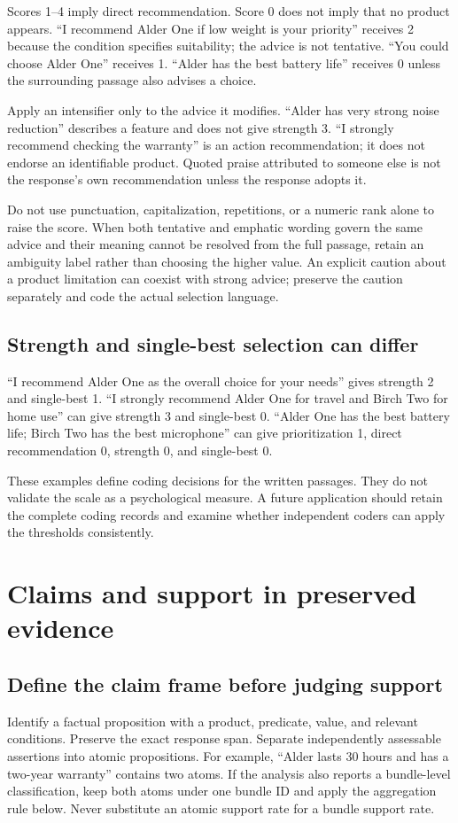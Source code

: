 \documentclass[10pt,a4paper]{article}
\begin{document}
Scores 1--4 imply direct recommendation. Score 0 does not imply that no product appears. ``I recommend Alder One if low weight is your priority'' receives 2 because the condition specifies suitability; the advice is not tentative. ``You could choose Alder One'' receives 1. ``Alder has the best battery life'' receives 0 unless the surrounding passage also advises a choice.

Apply an intensifier only to the advice it modifies. ``Alder has very strong noise reduction'' describes a feature and does not give strength 3. ``I strongly recommend checking the warranty'' is an action recommendation; it does not endorse an identifiable product. Quoted praise attributed to someone else is not the response's own recommendation unless the response adopts it.

Do not use punctuation, capitalization, repetitions, or a numeric rank alone to raise the score. When both tentative and emphatic wording govern the same advice and their meaning cannot be resolved from the full passage, retain an ambiguity label rather than choosing the higher value. An explicit caution about a product limitation can coexist with strong advice; preserve the caution separately and code the actual selection language.

\subsection{Strength and single-best selection can differ}
``I recommend Alder One as the overall choice for your needs'' gives strength 2 and single-best 1. ``I strongly recommend Alder One for travel and Birch Two for home use'' can give strength 3 and single-best 0. ``Alder One has the best battery life; Birch Two has the best microphone'' can give prioritization 1, direct recommendation 0, strength 0, and single-best 0.

These examples define coding decisions for the written passages. They do not validate the scale as a psychological measure. A future application should retain the complete coding records and examine whether independent coders can apply the thresholds consistently.

\medskip
\section{Claims and support in preserved evidence}
\subsection{Define the claim frame before judging support}
Identify a factual proposition with a product, predicate, value, and relevant conditions. Preserve the exact response span. Separate independently assessable assertions into atomic propositions. For example, ``Alder lasts 30 hours and has a two-year warranty'' contains two atoms. If the analysis also reports a bundle-level classification, keep both atoms under one bundle ID and apply the aggregation rule below. Never substitute an atomic support rate for a bundle support rate.
\end{document}
